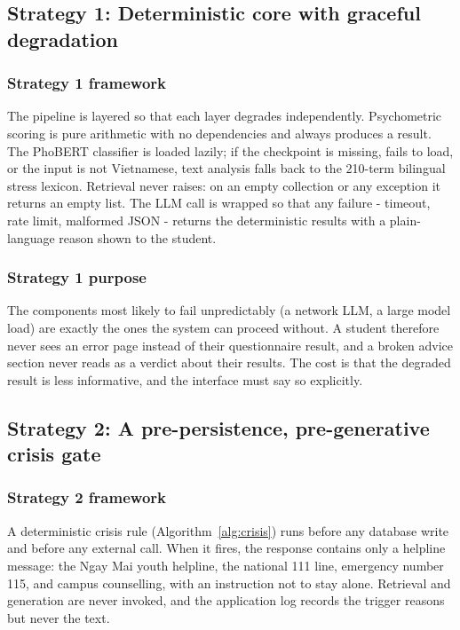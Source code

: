 \subsection{Strategy 1: Deterministic core with graceful degradation}
\subsubsection{Strategy 1 framework}
The pipeline is layered so that each layer degrades independently. Psychometric scoring is pure arithmetic with no dependencies and always produces a result. The PhoBERT classifier is loaded lazily; if the checkpoint is missing, fails to load, or the input is not Vietnamese, text analysis falls back to the 210-term bilingual stress lexicon. Retrieval never raises: on an empty collection or any exception it returns an empty list. The LLM call is wrapped so that any failure - timeout, rate limit, malformed JSON - returns the deterministic results with a plain-language reason shown to the student.

\subsubsection{Strategy 1 purpose}
The components most likely to fail unpredictably (a network LLM, a large model load) are exactly the ones the system can proceed without. A student therefore never sees an error page instead of their questionnaire result, and a broken advice section never reads as a verdict about their results. The cost is that the degraded result is less informative, and the interface must say so explicitly.

\subsection{Strategy 2: A pre-persistence, pre-generative crisis gate}
\subsubsection{Strategy 2 framework}
A deterministic crisis rule (Algorithm~\ref{alg:crisis}) runs before any database write and before any external call. When it fires, the response contains only a helpline message: the Ngay Mai youth helpline, the national 111 line, emergency number 115, and campus counselling, with an instruction not to stay alone. Retrieval and generation are never invoked, and the application log records the trigger reasons but never the text.

